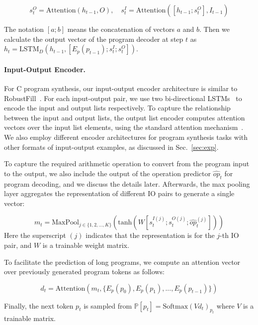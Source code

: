 \[s_t^O=\mathrm{Attention}(h_{t-1}, O), \quad s_t^I=\mathrm{Attention}([h_{t-1}; s_t^O], \hat I_{t-1})\]

The notation $[a; b]$ means the concatenation of vectors $a$ and $b$. Then we calculate the output vector of the program decoder at step $t$ as $h_t=\mathrm{LSTM}_D(h_{t-1}, [E_p(p_{t-1}); s_t^I; s_t^O])$.

\paragraph{Input-Output Encoder.} For C program synthesis, our input-output encoder architecture is similar to RobustFill~\cite{devlin2017robustfill}. For each input-output pair, we use two bi-directional LSTMs~\cite{hochreiter1997long} to encode the input and output lists respectively. To capture the relationship between the input and output lists, the output list encoder computes attention vectors over the input list elements, using the standard attention mechanism~\cite{bahdanau2014neural,luong2015effective}. We also employ different encoder architectures for program synthesis tasks with other formats of input-output examples, as discussed in Sec.~\ref{sec:exp}.


To capture the required arithmetic operation to convert from the program input to the output, we also include the output of the operation predictor $\hat{op}_t$ for program decoding, and we discuss the details later. Afterwards, the max pooling layer aggregates the representation of different IO pairs to generate a single vector:

\[m_t=\mathrm{MaxPool}_{j \in \{1,2,...,K\}}(\mathrm{tanh}(W[s_t^{I(j)}; s_t^{O(j)}; \hat{op}_t^{(j)}]))\]
Here the superscript $(j)$ indicates that the representation is for the $j$-th IO pair, and $W$ is a trainable weight matrix.

To facilitate the prediction of long programs, we compute an attention vector over previously generated program tokens as follows:

\[d_t=\mathrm{Attention}(m_t, \{E_p(p_0), E_p(p_1), ..., E_p(p_{t-1})\})\]

Finally, the next token $p_t$ is sampled from $\mathbb{P}[p_t]=\mathrm{Softmax}(Vd_t)_{p_t}$ where $V$ is a trainable matrix.

